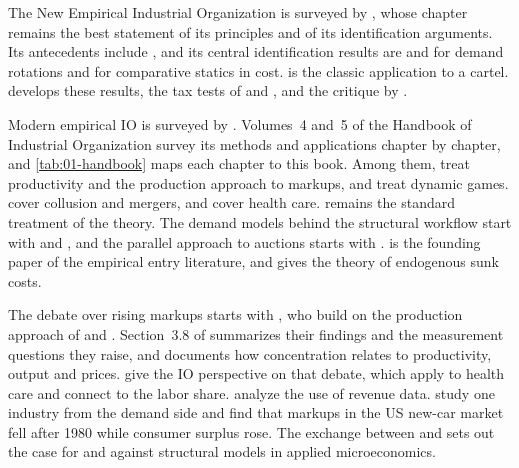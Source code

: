The New Empirical Industrial Organization is surveyed by \citet{Bresnahan1989}, whose chapter remains the best
statement of its principles and of its identification arguments. Its antecedents include \citet{Rosse1970}, and
its central identification results are \citet{Bresnahan1982} and \citet{Lau1982} for demand rotations and
\citet{PanzarRosse1987} for comparative statics in cost. \citet{Porter1983} is the classic application to a
cartel.  develops these results, the tax tests of \citet{Sumner1981} and
\citet{AshenfelterSullivan1987}, and the critique by \citet{Corts1999}.

Modern empirical IO is surveyed by \citet{EinavLevin2010}. Volumes~4 and~5 of the Handbook of Industrial
Organization \citep{HoHortacsuLizzeri2021a,HoHortacsuLizzeri2021} survey its methods and applications chapter by
chapter, and \cref{tab:01-handbook} maps each chapter to this book. Among them, \citet{DeLoeckerSyverson2021} treat
productivity and the production approach to markups, and \citet{AguirregabiriaCollardWexlerRyan2021} treat dynamic
games. \citet{AskerNocke2021} cover collusion and mergers, and \citet{HandelHo2021} cover health care. \citet{Tirole1988} remains the
standard treatment of the theory. The demand models behind the structural workflow start with \citet{Berry1994} and
\citet{BerryLevinsohnPakes1995}, and the parallel approach to auctions starts with \citet{GuerrePerrigneVuong2000}.
\citet{BresnahanReiss1991} is the founding paper of the empirical entry literature, and \citet{Sutton1991} gives
the theory of endogenous sunk costs.

The debate over rising markups starts with \citet{DeLoeckerEeckhoutUnger2020}, who build on the production
approach of \citet{Hall1988} and \citet{DeLoeckerWarzynski2012}. Section~3.8 of \citet{AskerNocke2021}
summarizes their findings and the measurement questions they raise, and \citet{Ganapati2020} documents how
concentration relates to productivity, output and prices. \citet{BerryGaynorScottMorton2019} give the IO
perspective on that debate, which \citet{HandelHo2021} apply to health care and \citet{AutorEtAl2020} connect to
the labor share. \citet{BondEtAl2021} analyze the use of revenue data. \citet{GriecoMurryYurukoglu2024} study one
industry from the demand side and find that markups in the US new-car market fell after 1980 while consumer
surplus rose. The exchange between
\citet{AngristPischke2010} and \citet{EinavLevin2010} sets out the case for and against structural models in
applied microeconomics.

